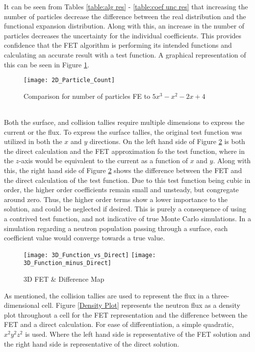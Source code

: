 \documentclass[10tma4paper]{article}
\begin{document}
It can be seen from Tables \ref{table:alg res} - \ref{table:coef unc res} that increasing the number of particles decrease the difference between the real distribution and the functional expansion distribution. Along with this, an increase in the number of particles decreases the uncertainty for the individual coefficients. This provides confidence that the FET algorithm is performing its intended functions and calculating an accurate result with a test function. A graphical representation of this can be seen in Figure \ref{2D Plot}.
\begin{figure}[!htbp]
	\caption{Comparison for number of particles FE to $5x^{3}-x^{2}-2x+4$}
	\begin{center}
		\texttt{[image: 2D\_Particle\_Count]}
		\label{2D Plot}
	\end{center}
\end{figure}
\\
Both the surface, and collision tallies require multiple dimensions to express the current or the flux. To express the surface tallies, the original test function was utilized in both the $x$ and $y$ directions. On the left hand side of Figure \ref{3D Plot} is both the direct calculation and the FET approximation fo the test function, where in the $z$-axis would be equivalent to the current as a function of $x$ and $y$. Along with this, the right hand side of Figure \ref{3D Plot} shows the difference between the FET and the direct calculation of the test function. Due to this test function being cubic in order, the higher order coefficients remain small and unsteady, but congregate around zero. Thus, the higher order terms show a lower importance to the solution, and could be neglected if desired. This is purely a consequence of using a contrived test function, and not indicative of true Monte Carlo simulations. In a simulation regarding a neutron population passing through a surface, each coefficient value would converge towards a true value.
\begin{figure}[H]
	\caption{3D FET \& Difference Map}
	\begin{center}
		\texttt{[image: 3D\_Function\_vs\_Direct]}
		\texttt{[image: 3D\_Function\_minus\_Direct]}
	\end{center}
	\label{3D Plot}
\end{figure}
As mentioned, the collision tallies are used to represent the flux in a three-dimensional cell. Figure \ref{Density Plot} represents the neutron flux as a density plot throughout a cell for the FET representation and the difference between the FET and a direct calculation. For ease of differentiation, a simple quadratic, $x^{2}y^{2}z^{2}$ is used. Where the left hand side is representative of the FET solution and the right hand side is representative of the direct solution.
\end{document}
